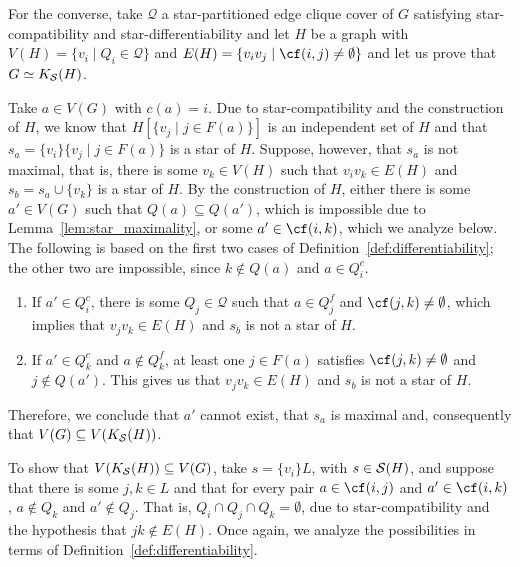 \begin{tproof}
    For the converse, take $\mathcal{Q}$ a star-partitioned edge clique cover of $G$ satisfying star-compatibility and star-differentiability and let $H$ be a graph with $V(H) = \{v_i \mid Q_i \in \mathcal{Q}\}$ and $E(H) = \{v_iv_j \mid \cf(i,j) \neq \emptyset\}$ and let us prove that $G \simeq K_{\mathcal{S}}(H)$.
    
    Take $a \in V(G)$ with $c(a) = i$.
    Due to star-compatibility and the construction of $H$, we know that $H[\{v_j \mid j \in F(a)\}]$ is an independent set of $H$ and that $s_a = \{v_i\}\{v_j \mid j \in F(a)\}$ is a star of $H$.
    Suppose, however, that $s_a$ is not maximal, that is, there is some $v_k \in V(H)$ such that $v_iv_k \in E(H)$ and $s_b = s_a \cup \{v_k\}$ is a star of $H$.
    By the construction of $H$, either there is some $a' \in V(G)$ such that $Q(a) \subseteq Q(a')$, which is impossible due to Lemma~\ref{lem:star_maximality}, or some $a' \in \cf(i,k)$, which we analyze below.
    The following is based on the first two cases of Definition~\ref{def:differentiability}; the other two are impossible, since $k \notin Q(a)$ and $a \in Q_i^c$.
    
    \begin{enumerate}
        \item If $a' \in Q_i^c$, there is some $Q_j \in \mathcal{Q}$ such that $a \in Q_j^f$ and $\cf(j,k) \neq \emptyset$, which implies that $v_jv_k \in E(H)$ and $s_b$ is not a star of $H$. 
        \item If $a' \in Q_k^c$ and $a \notin Q_k^f$, at least one $j \in F(a)$ satisfies $\cf(j,k) \neq \emptyset$ and $j \notin Q(a')$.
        This gives us that $v_jv_k \in E(H)$ and $s_b$ is not a star of $H$.
    \end{enumerate}
    
    Therefore, we conclude that $a'$ cannot exist, that $s_a$ is maximal and, consequently that $V(G) \subseteq V(K_{\mathcal{S}}(H))$.
    
    To show that $V(K_{\mathcal{S}}(H)) \subseteq V(G)$, take $s = \{v_i\}L$, with $s \in \mathcal{S}(H)$, and suppose that there is some $j,k \in L$ and that for every pair $a \in \cf(i,j)$ and $a' \in \cf(i,k)$, $a \notin Q_k$ and $a' \notin Q_j$.
    That is, $Q_i \cap Q_j \cap Q_k = \emptyset$, due to star-compatibility and the hypothesis that $jk \notin E(H)$.
    Once again, we analyze the possibilities in terms of Definition~\ref{def:differentiability}.
    

\end{tproof}
